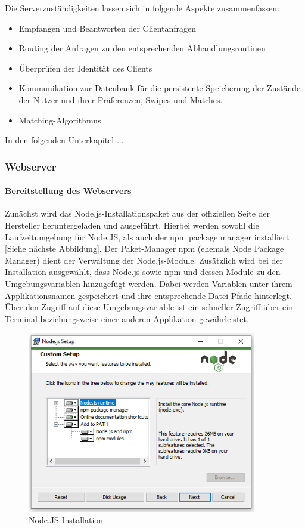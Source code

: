 Die Serverzuständigkeiten lassen sich in folgende Aspekte zusammenfassen:
\begin{itemize}
\item Empfangen und Beantworten der Clientanfragen
\item Routing der Anfragen zu den entsprechenden Abhandlungsroutinen
\item Überprüfen der Identität des Clients
\item Kommunikation zur Datenbank für die persistente Speicherung der Zustände der Nutzer und ihrer Präferenzen, Swipes und Matches.
\item Matching-Algorithmus
\end{itemize} 

In den folgenden Unterkapitel ....

\subsubsection{Webserver}
\paragraph{Bereitstellung des Webservers}
Zunächst wird das Node.js-Installationspaket aus der offiziellen Seite der Hersteller heruntergeladen und ausgeführt. Hierbei werden sowohl die Laufzeitumgebung für Node.JS, als auch der npm package manager installiert [Siehe nächste Abbildung]. 
Der Paket-Manager npm (ehemals Node Package Manager) dient der Verwaltung der Node.js-Module. 
Zusätzlich wird bei der Installation ausgewählt, dass Node.js sowie npm und dessen Module zu den Umgebungsvariablen hinzugefügt werden. Dabei werden Variablen unter ihrem Applikationsnamen gespeichert und ihre entsprechende Datei-Pfade hinterlegt.
Über den Zugriff auf diese Umgebungsvariable ist ein schneller Zugriff über ein Terminal beziehungsweise einer anderen Applikation gewährleistet.


\begin{figure}[h]
\centering
\includegraphics[width=10cm]{images/nodejs_install.png}
\caption{Node.JS Installation}
\end{figure}

